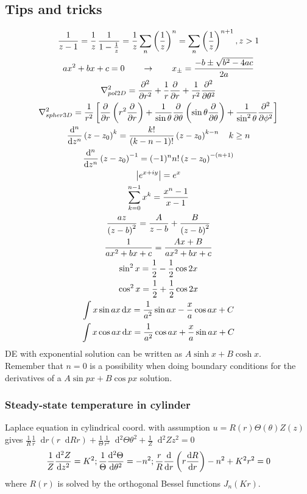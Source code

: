 \documentclass[a4paper, 10pt]{article}
\newcommand*\diff{\mathop{}\!\mathrm{d}}
\begin{document}
\begin{multicols*}{3}
\begin{mdframed}
\subsection*{Tips and tricks}
\end{mdframed}
\begin{multline*}
  \frac{1}{z-1} = \frac{1}{z}\,\frac{1}{1-\frac{1}{z}} = \frac{1}{z}\sum_n\left(\frac{1}{z}\right)^n = \sum_n\left(\frac{1}{z}\right)^{n+1}, z>1 \\
  ax^2 + bx + c = 0 \qquad \rightarrow \qquad x_{\pm} = \frac{-b \pm \sqrt{b^2 - 4ac}}{2a} \\
  \nabla^2_{pol2D} = \pdv[2]{}{r} + \frac{1}{r}\pdv{}{r} + \frac{1}{r^2}\pdv[2]{}{\theta}\\
  \nabla^2_{spher3D} = \frac{1}{r^2}\left[ \pdv{}{r}\left( r^2\pdv{}{r} \right) + \frac{1}{\sin{\theta}}\pdv{}{\theta}\left( \sin{\theta}\pdv{}{\theta}\right) + \frac{1}{\sin^2{\theta}}\pdv[2]{}{\phi}\right]\\
  \dv[n]{}{z}\left(z-z_0\right)^{k} = \frac{k!}{(k-n-1)!}\left(z-z_0\right)^{k-n}\quad k\geq n\\
  \dv[n]{}{z}\left(z-z_0\right)^{-1} = (-1)^nn!\left(z-z_0\right)^{-(n+1)}\\
  \abs{e^{x+iy}} = e^x\\
  \sum_{k=0}^{n-1} x^k = \frac{x^n - 1}{x-1} \\
  \frac{az}{\left(z-b\right)^2} = \frac{A}{z-b} + \frac{B}{\left(z-b\right)^2} \\
  \frac{1}{ax^2+bx+c} = \frac{Ax+B}{ax^2 + bx + c}\\
  \sin^2{x} = \frac{1}{2}-\frac{1}{2}\cos{2x} \\
  \cos^2{x} = \frac{1}{2}+\frac{1}{2}\cos{2x} \\
  \int x \sin{ax} \diff x = \frac{1}{a^2}\sin{ax}-\frac{x}{a}\cos{ax}+C \\
  \int x \cos{ax} \diff x = \frac{1}{a^2}\cos{ax}+\frac{x}{a}\sin{ax}+C \\
\end{multline*}
DE with exponential solution can be written as $A\sinh{x} + B\cosh{x}$.\\
Remember that $n=0$ is a possibility when doing boundary conditions for the derivatives of a $A\sin{px} + B\cos{px}$ solution.
\subsubsection*{\small Steady-state temperature in cylinder}
Laplace equation in cylindrical coord. with assumption $u=R(r)\Theta(\theta)Z(z)$ gives
$\frac{1}{R}\frac{1}{r}\diff{}{r}\left(r\diff{R}{r}\right)+\frac{1}{\Theta}\frac{1}{r^2}\diff{^2\Theta}{\theta^2}+\frac{1}{Z}\diff{^2 Z}{z^2}=0$
$$
 \frac{1}{Z}\dv[2]{Z}{z}=K^2;
 \frac{1}{\Theta} \dv[2]{\Theta}{\theta}=-n^2;
 \frac{r}{R}\dv{}{r}\left(r\dv{R}{r}\right)-n^2+K^2 r^2=0
$$
where $R(r)$ is solved by the orthogonal Bessel functions $J_n(Kr)$.

\end{multicols*}
\end{document}
